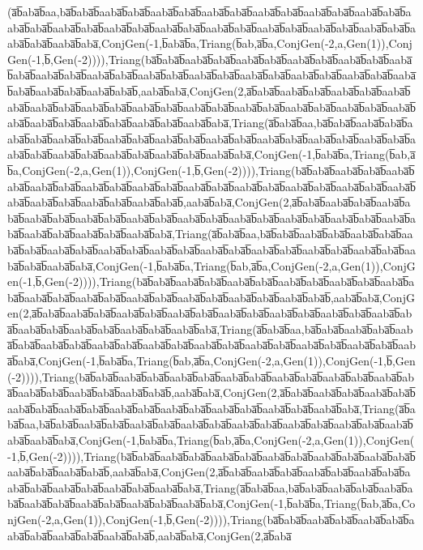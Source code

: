 (a̅b̅aba̅b̅aa,ba̅b̅aba̅b̅aaba̅b̅aba̅b̅aaba̅b̅aba̅b̅aaba̅b̅aba̅b̅aaba̅b̅aba̅b̅aaba̅b̅aba̅b̅aaba̅b̅aba̅b̅aaba̅b̅aba̅b̅aaba̅b̅aba̅b̅aaba̅b̅aba̅b̅aaba̅b̅aba̅b̅aaba̅b̅aba̅b̅aaba̅b̅aba̅b̅aaba̅b̅aba̅b̅aaba̅b̅aba̅b̅aaba̅b̅aba̅b̅aaba̅b̅aba̅,ConjGen(-1,b̅aba̅b̅a,Triang(b̅ab,a̅b̅a,ConjGen(-2,a,Gen(1)),ConjGen(-1,b̅,Gen(-2)))),Triang(ba̅b̅aba̅b̅aaba̅b̅aba̅b̅aaba̅b̅aba̅b̅aaba̅b̅aba̅b̅aaba̅b̅aba̅b̅aaba̅b̅aba̅b̅aaba̅b̅aba̅b̅aaba̅b̅aba̅b̅aaba̅b̅aba̅b̅aaba̅b̅aba̅b̅aaba̅b̅aba̅b̅aaba̅b̅aba̅b̅aaba̅b̅aba̅b̅aaba̅b̅aba̅b̅aaba̅b̅aba̅b̅aaba̅b̅aba̅b̅,aaba̅b̅aba̅,ConjGen(2,a̅b̅aba̅b̅aaba̅b̅aba̅b̅aaba̅b̅aba̅b̅aaba̅b̅aba̅b̅aaba̅b̅aba̅b̅aaba̅b̅aba̅b̅aaba̅b̅aba̅b̅aaba̅b̅aba̅b̅aaba̅b̅aba̅b̅aaba̅b̅aba̅b̅aaba̅b̅aba̅b̅aaba̅b̅aba̅b̅aaba̅b̅aba̅b̅aaba̅b̅aba̅b̅aaba̅b̅aba̅b̅aaba̅b̅aba̅,Triang(a̅b̅aba̅b̅aa,ba̅b̅aba̅b̅aaba̅b̅aba̅b̅aaba̅b̅aba̅b̅aaba̅b̅aba̅b̅aaba̅b̅aba̅b̅aaba̅b̅aba̅b̅aaba̅b̅aba̅b̅aaba̅b̅aba̅b̅aaba̅b̅aba̅b̅aaba̅b̅aba̅b̅aaba̅b̅aba̅b̅aaba̅b̅aba̅b̅aaba̅b̅aba̅b̅aaba̅b̅aba̅b̅aaba̅b̅aba̅,ConjGen(-1,b̅aba̅b̅a,Triang(b̅ab,a̅b̅a,ConjGen(-2,a,Gen(1)),ConjGen(-1,b̅,Gen(-2)))),Triang(ba̅b̅aba̅b̅aaba̅b̅aba̅b̅aaba̅b̅aba̅b̅aaba̅b̅aba̅b̅aaba̅b̅aba̅b̅aaba̅b̅aba̅b̅aaba̅b̅aba̅b̅aaba̅b̅aba̅b̅aaba̅b̅aba̅b̅aaba̅b̅aba̅b̅aaba̅b̅aba̅b̅aaba̅b̅aba̅b̅aaba̅b̅aba̅b̅aaba̅b̅aba̅b̅,aaba̅b̅aba̅,ConjGen(2,a̅b̅aba̅b̅aaba̅b̅aba̅b̅aaba̅b̅aba̅b̅aaba̅b̅aba̅b̅aaba̅b̅aba̅b̅aaba̅b̅aba̅b̅aaba̅b̅aba̅b̅aaba̅b̅aba̅b̅aaba̅b̅aba̅b̅aaba̅b̅aba̅b̅aaba̅b̅aba̅b̅aaba̅b̅aba̅b̅aaba̅b̅aba̅b̅aaba̅b̅aba̅,Triang(a̅b̅aba̅b̅aa,ba̅b̅aba̅b̅aaba̅b̅aba̅b̅aaba̅b̅aba̅b̅aaba̅b̅aba̅b̅aaba̅b̅aba̅b̅aaba̅b̅aba̅b̅aaba̅b̅aba̅b̅aaba̅b̅aba̅b̅aaba̅b̅aba̅b̅aaba̅b̅aba̅b̅aaba̅b̅aba̅b̅aaba̅b̅aba̅b̅aaba̅b̅aba̅,ConjGen(-1,b̅aba̅b̅a,Triang(b̅ab,a̅b̅a,ConjGen(-2,a,Gen(1)),ConjGen(-1,b̅,Gen(-2)))),Triang(ba̅b̅aba̅b̅aaba̅b̅aba̅b̅aaba̅b̅aba̅b̅aaba̅b̅aba̅b̅aaba̅b̅aba̅b̅aaba̅b̅aba̅b̅aaba̅b̅aba̅b̅aaba̅b̅aba̅b̅aaba̅b̅aba̅b̅aaba̅b̅aba̅b̅aaba̅b̅aba̅b̅aaba̅b̅aba̅b̅,aaba̅b̅aba̅,ConjGen(2,a̅b̅aba̅b̅aaba̅b̅aba̅b̅aaba̅b̅aba̅b̅aaba̅b̅aba̅b̅aaba̅b̅aba̅b̅aaba̅b̅aba̅b̅aaba̅b̅aba̅b̅aaba̅b̅aba̅b̅aaba̅b̅aba̅b̅aaba̅b̅aba̅b̅aaba̅b̅aba̅b̅aaba̅b̅aba̅,Triang(a̅b̅aba̅b̅aa,ba̅b̅aba̅b̅aaba̅b̅aba̅b̅aaba̅b̅aba̅b̅aaba̅b̅aba̅b̅aaba̅b̅aba̅b̅aaba̅b̅aba̅b̅aaba̅b̅aba̅b̅aaba̅b̅aba̅b̅aaba̅b̅aba̅b̅aaba̅b̅aba̅b̅aaba̅b̅aba̅,ConjGen(-1,b̅aba̅b̅a,Triang(b̅ab,a̅b̅a,ConjGen(-2,a,Gen(1)),ConjGen(-1,b̅,Gen(-2)))),Triang(ba̅b̅aba̅b̅aaba̅b̅aba̅b̅aaba̅b̅aba̅b̅aaba̅b̅aba̅b̅aaba̅b̅aba̅b̅aaba̅b̅aba̅b̅aaba̅b̅aba̅b̅aaba̅b̅aba̅b̅aaba̅b̅aba̅b̅aaba̅b̅aba̅b̅,aaba̅b̅aba̅,ConjGen(2,a̅b̅aba̅b̅aaba̅b̅aba̅b̅aaba̅b̅aba̅b̅aaba̅b̅aba̅b̅aaba̅b̅aba̅b̅aaba̅b̅aba̅b̅aaba̅b̅aba̅b̅aaba̅b̅aba̅b̅aaba̅b̅aba̅b̅aaba̅b̅aba̅,Triang(a̅b̅aba̅b̅aa,ba̅b̅aba̅b̅aaba̅b̅aba̅b̅aaba̅b̅aba̅b̅aaba̅b̅aba̅b̅aaba̅b̅aba̅b̅aaba̅b̅aba̅b̅aaba̅b̅aba̅b̅aaba̅b̅aba̅b̅aaba̅b̅aba̅,ConjGen(-1,b̅aba̅b̅a,Triang(b̅ab,a̅b̅a,ConjGen(-2,a,Gen(1)),ConjGen(-1,b̅,Gen(-2)))),Triang(ba̅b̅aba̅b̅aaba̅b̅aba̅b̅aaba̅b̅aba̅b̅aaba̅b̅aba̅b̅aaba̅b̅aba̅b̅aaba̅b̅aba̅b̅aaba̅b̅aba̅b̅aaba̅b̅aba̅b̅,aaba̅b̅aba̅,ConjGen(2,a̅b̅aba̅b̅aaba̅b̅aba̅b̅aaba̅b̅aba̅b̅aaba̅b̅aba̅b̅aaba̅b̅aba̅b̅aaba̅b̅aba̅b̅aaba̅b̅aba̅b̅aaba̅b̅aba̅,Triang(a̅b̅aba̅b̅aa,ba̅b̅aba̅b̅aaba̅b̅aba̅b̅aaba̅b̅aba̅b̅aaba̅b̅aba̅b̅aaba̅b̅aba̅b̅aaba̅b̅aba̅b̅aaba̅b̅aba̅,ConjGen(-1,b̅aba̅b̅a,Triang(b̅ab,a̅b̅a,ConjGen(-2,a,Gen(1)),ConjGen(-1,b̅,Gen(-2)))),Triang(ba̅b̅aba̅b̅aaba̅b̅aba̅b̅aaba̅b̅aba̅b̅aaba̅b̅aba̅b̅aaba̅b̅aba̅b̅aaba̅b̅aba̅b̅,aaba̅b̅aba̅,ConjGen(2,a̅b̅aba̅
